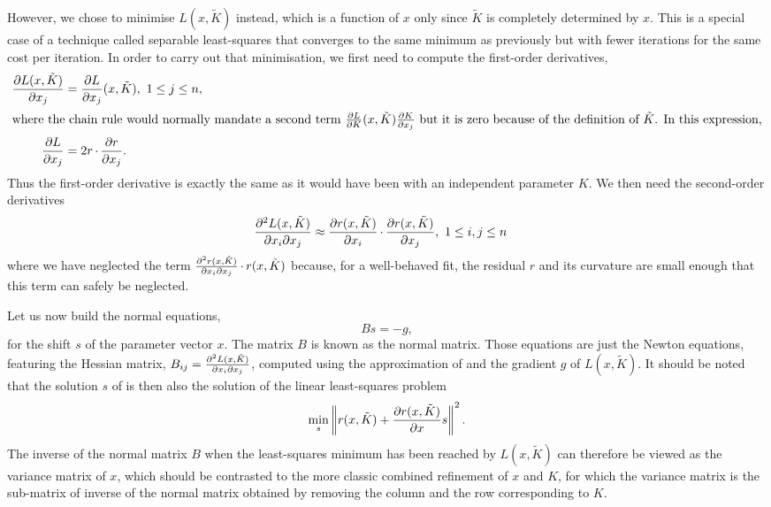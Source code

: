 \documentclass[pdf]{iucr}
\begin{document}
However, we chose to minimise $L(x, \tilde{K})$ instead, which is a function of $x$ only since $\tilde{K}$ is completely determined by $x$. This is a special case of a technique called separable least-squares \cite[, and references therein]{Nielsen:2000fr} that  converges to the same minimum as previously but with fewer iterations for the same cost per iteration. In order to carry out that minimisation, we first need to compute the first-order derivatives,
\begin{align}
\frac{\partial L(x, \tilde{K})}{\partial x_j} &= \frac{\partial L}{\partial x_j}(x, \tilde{K}),\ 1 \le j \le n, \\
\intertext{where the chain rule would normally mandate a second term $\frac{\partial L}{\partial K}(x, \tilde{K})\frac{\partial K}{\partial x_j}$ but it is zero because of the definition of $\tilde{K}$. In this expression,}
\frac{\partial L}{\partial x_j} &= 2 r \operatorname{\cdot} \frac{\partial r}{\partial x_j}.
\end{align}
Thus the first-order derivative is exactly the same as it would have been with an independent parameter $K$. We then need the second-order derivatives
\begin{align}
\frac{\partial^2 L(x, \tilde{K})}{\partial x_i \partial x_j} &\approx \frac{\partial r(x, \tilde{K})}{\partial x_i} \operatorname{\cdot} \frac{\partial r(x, \tilde{K})}{\partial x_j},\ 1 \le i,j \le n
\label{eqn:gaussleastsquares}
\end{align}
where we have neglected the term $\frac{\partial^2 r(x, \tilde{K})}{\partial x_i \partial x_j} \operatorname{\cdot} r(x, \tilde{K})$ because, for a well-behaved fit, the residual $r$ and its curvature are small enough that this term can safely be neglected.

Let us now build the normal equations, 
\begin{equation}
\label{eqn:gaussnewtoneq}
Bs = -g,
\end{equation}
for the shift $s$ of the parameter vector $x$. The matrix $B$ is known as the normal matrix. Those equations are just the Newton equations, featuring the Hessian matrix, $B_{ij} = \frac{\partial^2 L(x, \tilde{K})}{\partial x_i \partial x_j}$, computed using the approximation of  and the gradient $g$ of $L(x, \tilde{K})$. It should be noted that the solution $s$ of  is then also the solution of the linear least-squares problem
\begin{equation}
\label{eqn:gaussnewtonaslinearls}
\min_s \left\| r(x, \tilde{K}) + \frac{\partial r(x, \tilde{K})}{\partial x} s \right\|^2.
\end{equation}
The inverse of the normal matrix $B$ when the least-squares minimum has been reached by $L(x, \tilde{K})$ can therefore be viewed as the variance matrix of $x$, which should be contrasted to the more classic combined refinement of $x$ and $K$, for which the variance matrix is the sub-matrix of inverse of the normal matrix obtained by removing the column and the row corresponding to $K$. 
\end{document}
